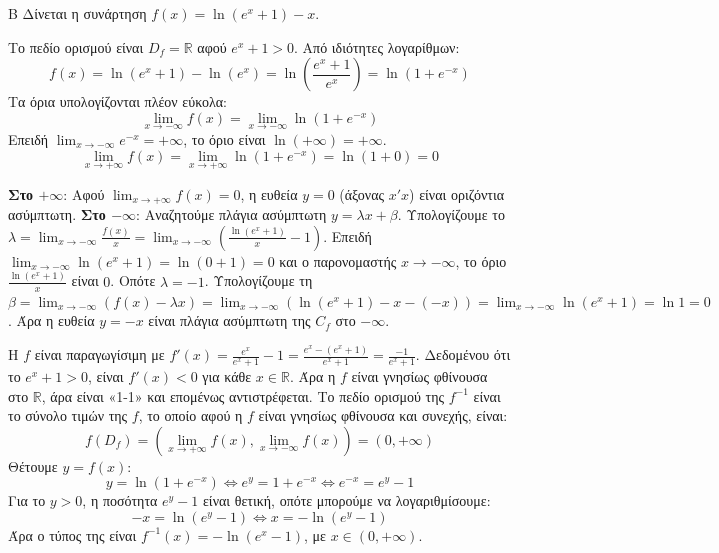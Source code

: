 \begin{thema}{Β}
Δίνεται η συνάρτηση $f(x) = \ln(e^x + 1) - x$.

\begin{erwthma}
\item Το πεδίο ορισμού είναι $D_f = \mathbb{R}$ αφού $e^x+1>0$.
Από ιδιότητες λογαρίθμων:
\[ f(x) = \ln(e^x + 1) - \ln(e^x) = \ln\left( \frac{e^x+1}{e^x} \right) = \ln(1 + e^{-x}) \]
Τα όρια υπολογίζονται πλέον εύκολα:
\[ \lim_{x\to-\infty} f(x) = \lim_{x\to-\infty} \ln(1 + e^{-x}) \]
Επειδή $\lim_{x\to-\infty} e^{-x} = +\infty$, το όριο είναι $\ln(+\infty) = +\infty$.
\[ \lim_{x\to+\infty} f(x) = \lim_{x\to+\infty} \ln(1 + e^{-x}) = \ln(1+0) = 0 \]

\item \textbf{Στο $+\infty$}: 
Αφού $\lim_{x\to+\infty} f(x) = 0$, η ευθεία $y = 0$ (άξονας $x'x$) είναι οριζόντια ασύμπτωτη.
\textbf{Στο $-\infty$}:
Αναζητούμε πλάγια ασύμπτωτη $y = \lambda x + \beta$.
Υπολογίζουμε το $\lambda = \lim_{x\to-\infty} \frac{f(x)}{x} = \lim_{x\to-\infty} \left( \frac{\ln(e^x+1)}{x} - 1 \right)$.
Επειδή $\lim_{x\to-\infty} \ln(e^x+1) = \ln(0+1) = 0$ και ο παρονομαστής $x \to -\infty$, το όριο $\frac{\ln(e^x+1)}{x}$ είναι $0$. Οπότε $\lambda = -1$.
Υπολογίζουμε τη $\beta = \lim_{x\to-\infty} (f(x) - \lambda x) = \lim_{x\to-\infty} (\ln(e^x+1) - x - (-x)) = \lim_{x\to-\infty} \ln(e^x+1) = \ln 1 = 0$.
Άρα η ευθεία $y = -x$ είναι πλάγια ασύμπτωτη της $C_f$ στο $-\infty$.

\item Η $f$ είναι παραγωγίσιμη με $f'(x) = \frac{e^x}{e^x+1} - 1 = \frac{e^x - (e^x+1)}{e^x+1} = \frac{-1}{e^x+1}$.
Δεδομένου ότι το $e^x+1 > 0$, είναι $f'(x) < 0$ για κάθε $x \in \mathbb{R}$.
Άρα η $f$ είναι γνησίως φθίνουσα στο $\mathbb{R}$, άρα είναι «1-1» και επομένως αντιστρέφεται.
Το πεδίο ορισμού της $f^{-1}$ είναι το σύνολο τιμών της $f$, το οποίο αφού η $f$ είναι γνησίως φθίνουσα και συνεχής, είναι:
\[ f(D_f) = \left( \lim_{x\to+\infty} f(x), \lim_{x\to-\infty} f(x) \right) = (0, +\infty) \]
Θέτουμε $y = f(x)$:
\[ y = \ln(1+e^{-x}) \Leftrightarrow e^y = 1+e^{-x} \Leftrightarrow e^{-x} = e^y - 1 \]
Για το $y > 0$, η ποσότητα $e^y - 1$ είναι θετική, οπότε μπορούμε να λογαριθμίσουμε:
\[ -x = \ln(e^y - 1) \Leftrightarrow x = -\ln(e^y-1) \]
Άρα ο τύπος της είναι $f^{-1}(x) = -\ln(e^x - 1)$, με $x \in (0, +\infty)$.


\end{erwthma}
\end{thema}
